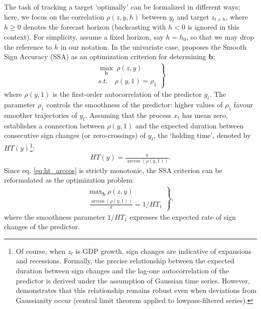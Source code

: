 \documentclass[11pt,a4paper]{article}
\begin{document}
The task of tracking a target `optimally' can be formalized in different ways; here, we focus on the correlation $\rho(z,y,h)$ between $y_t$ and target $z_{t+h}$, where $h\geq 0$ denotes the forecast horizon (backcasting with $h<0$ is ignored in this context). For simplicity, assume a fixed horizon, say $h=h_0$, so that we may drop the reference to $h$ in our notation. In the univariate case, \cite{Wildi2025} proposes the Smooth Sign Accuracy (SSA) as an optimization criterion for determining $\mathbf{b}$:
\begin{eqnarray}\label{eq:critssa}
\left.\begin{array}{c}\max_{\mathbf{b}}~\rho(z,y)\\
s.t. \quad \rho(y,1)=\rho_1\end{array}\right\}
\end{eqnarray}
where $\rho(y,1)$ is the first-order autocorrelation of the predictor $y_t$. The parameter $\rho_1$ controls the smoothness of the predictor: higher values of $\rho_1$ favour smoother trajectories of $y_t$. Assuming that the process $x_t$ has mean zero, \cite{Wildi2024} establishes a connection between $\rho(y,1)$ and the expected duration between consecutive sign changes (or zero-crossings) of $y_t$, the `holding time', denoted by $HT(y)$\footnote{Of course, when $z_t$ is GDP growth, sign changes are indicative of expansions and recessions. Formally, the precise relationship between the expected duration between sign changes and the lag-one autocorrelation of the predictor is derived under the assumption of Gaussian time series. However, \cite{Wildi2024} demonstrates that this relationship remains robust even when deviations from Gaussianity occur (central limit theorem applied to lowpass-filtered series).}:
\begin{eqnarray}\label{eq:ht}
HT(y)=\frac{\pi}{\arccos(\rho(y,1))}.
\label{eq:ht_arccos}
\end{eqnarray}
Since eq. \eqref{eq:ht_arccos} is strictly monotonic, the SSA criterion can be reformulated as the optimization problem:
\begin{eqnarray}\label{eq:critssaht}
\left.\begin{array}{c}\textrm{max}_{\mathbf{b}}~\rho(z,y)\\
\frac{\arccos(\rho(y,1))}{\pi}=1/HT_1\end{array}\right\},
\end{eqnarray}
where the smoothness parameter $1/HT_1$ expresses the expected rate of sign changes of the predictor. \\
\end{document}
